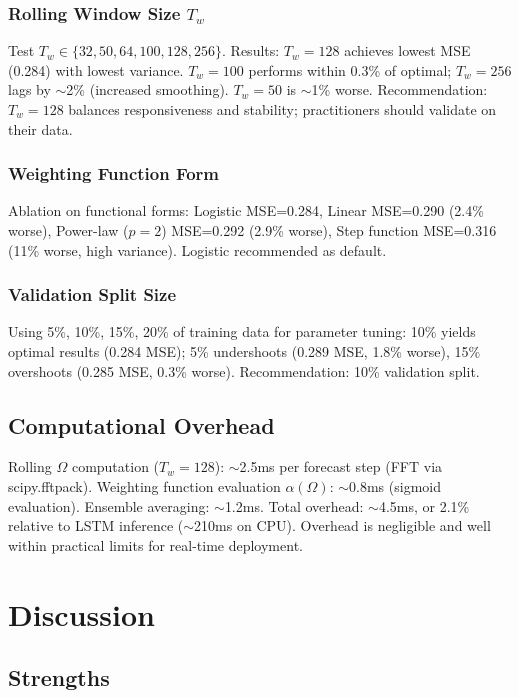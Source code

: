 \documentclass[11pt,letterpaper]{article}
\begin{document}
\subsubsection{Rolling Window Size $T_w$}

Test $T_w \in \{32, 50, 64, 100, 128, 256\}$. Results: $T_w=128$ achieves lowest MSE (0.284) with lowest variance. $T_w=100$ performs within 0.3\% of optimal; $T_w=256$ lags by $\sim$2\% (increased smoothing). $T_w=50$ is $\sim$1\% worse. Recommendation: $T_w=128$ balances responsiveness and stability; practitioners should validate on their data.

\subsubsection{Weighting Function Form}

Ablation on functional forms: Logistic MSE=0.284, Linear MSE=0.290 (2.4\% worse), Power-law ($p=2$) MSE=0.292 (2.9\% worse), Step function MSE=0.316 (11\% worse, high variance). Logistic recommended as default.

\subsubsection{Validation Split Size}

Using 5\%, 10\%, 15\%, 20\% of training data for parameter tuning: 10\% yields optimal results (0.284 MSE); 5\% undershoots (0.289 MSE, 1.8\% worse), 15\% overshoots (0.285 MSE, 0.3\% worse). Recommendation: 10\% validation split.

\subsection{Computational Overhead}

Rolling $\Omega$ computation ($T_w=128$): $\sim$2.5ms per forecast step (FFT via scipy.fftpack). Weighting function evaluation $\alpha(\Omega)$: $\sim$0.8ms (sigmoid evaluation). Ensemble averaging: $\sim$1.2ms. Total overhead: $\sim$4.5ms, or 2.1\% relative to LSTM inference ($\sim$210ms on CPU). Overhead is negligible and well within practical limits for real-time deployment.

\section{Discussion}

\subsection{Strengths}
\end{document}

